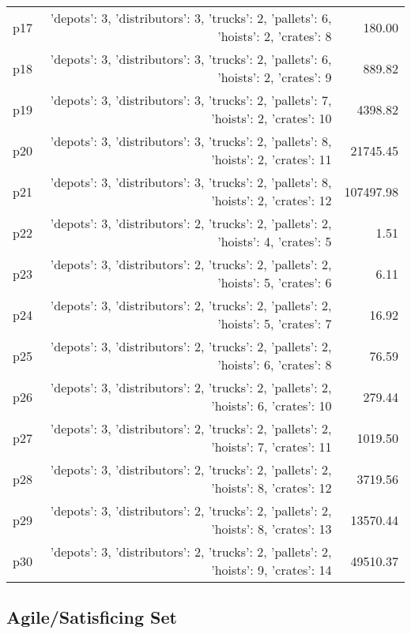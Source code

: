 \documentclass{article}
\begin{document}
\begin{center}
\begin{tabular}{@{}l|r|r@{}}
  p17&{'depots': 3, 'distributors': 3, 'trucks': 2, 'pallets': 6, 'hoists': 2, 'crates': 8}&180.00\\
  p18&{'depots': 3, 'distributors': 3, 'trucks': 2, 'pallets': 6, 'hoists': 2, 'crates': 9}&889.82\\
  p19&{'depots': 3, 'distributors': 3, 'trucks': 2, 'pallets': 7, 'hoists': 2, 'crates': 10}&4398.82\\
  p20&{'depots': 3, 'distributors': 3, 'trucks': 2, 'pallets': 8, 'hoists': 2, 'crates': 11}&21745.45\\
  p21&{'depots': 3, 'distributors': 3, 'trucks': 2, 'pallets': 8, 'hoists': 2, 'crates': 12}&107497.98\\
  p22&{'depots': 3, 'distributors': 2, 'trucks': 2, 'pallets': 2, 'hoists': 4, 'crates': 5}&1.51\\
  p23&{'depots': 3, 'distributors': 2, 'trucks': 2, 'pallets': 2, 'hoists': 5, 'crates': 6}&6.11\\
  p24&{'depots': 3, 'distributors': 2, 'trucks': 2, 'pallets': 2, 'hoists': 5, 'crates': 7}&16.92\\
  p25&{'depots': 3, 'distributors': 2, 'trucks': 2, 'pallets': 2, 'hoists': 6, 'crates': 8}&76.59\\
  p26&{'depots': 3, 'distributors': 2, 'trucks': 2, 'pallets': 2, 'hoists': 6, 'crates': 10}&279.44\\
  p27&{'depots': 3, 'distributors': 2, 'trucks': 2, 'pallets': 2, 'hoists': 7, 'crates': 11}&1019.50\\
  p28&{'depots': 3, 'distributors': 2, 'trucks': 2, 'pallets': 2, 'hoists': 8, 'crates': 12}&3719.56\\
  p29&{'depots': 3, 'distributors': 2, 'trucks': 2, 'pallets': 2, 'hoists': 8, 'crates': 13}&13570.44\\
  p30&{'depots': 3, 'distributors': 2, 'trucks': 2, 'pallets': 2, 'hoists': 9, 'crates': 14}&49510.37
                            \end{tabular}
                            \end{center}
                    

                                \subsection*{Agile/Satisficing Set}
                                
\end{document}
